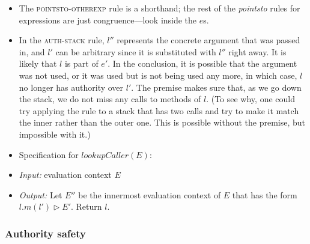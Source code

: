 \documentclass{llncs}
\begin{document}
\begin{itemize}
\item The \textsc{pointsto-otherexp} rule is a shorthand; the rest of the \textit{pointsto} rules for expressions are just congruence---look inside the $e$s.
\item In the \textsc{auth-stack} rule, $l''$ represents the concrete argument that was passed in, and $l'$ can be arbitrary since it is substituted with $l''$ right away.  It is likely that $l$ is part of $e'$. In the conclusion, it is possible that the argument was not used, or it was used but is not being used any more, in which case, $l$ no longer has authority over $l'$. The premise makes sure that, as we go down the stack, we do not miss any calls to methods of $l$. (To see why, one could try applying the rule to a stack that has two calls and try to make it match the inner rather than the outer one. This is possible without the premise, but impossible with it.)
\item Specification for $lookupCaller(E)$:
\item[] \emph{Input:} evaluation context $E$
\item[] \emph{Output:} Let $E''$ be the innermost evaluation context of $E$ that has the form $l.m(l') \rhd E'$. Return $l$.

\end{itemize}


\subsubsection{Authority safety}
\end{document}
